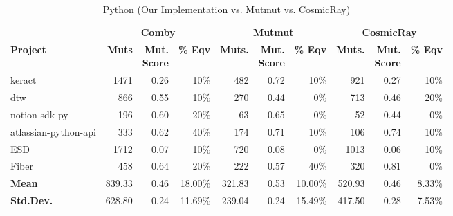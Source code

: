 \documentclass[sigconf,review, anonymous]{acmart}
\newcommand{\mc}[3]{\multicolumn{#1}{#2}{#3}}
\begin{document}
\begin{table*}[htbp]
\centering
{
\caption{Python (Our Implementation vs. Mutmut vs. CosmicRay)}
\label{tab:table_python2}
\begin{tabular}{l|rrr|rrr|rrr}
\toprule
                 & \mc{3}{c|}{\textbf{Comby}}   & \mc{3}{c|}{\textbf{Mutmut}} & \mc{3}{c}{\textbf{CosmicRay}} \\
\textbf{Project} & \textbf{Muts} &  \makecell{\textbf{Mut.} \\ \textbf{Score}} & \textbf{\% Eqv}
& \textbf{Muts.} &  \makecell{\textbf{Mut.} \\ \textbf{Score}} & \textbf{\% Eqv} 
& \textbf{Muts.} &  \makecell{\textbf{Mut.} \\ \textbf{Score}} & \textbf{\% Eqv} \\ \midrule
\midrule
keract & 1471 & 0.26 & 10\% & 482 & 0.72 & 10\% & 921 & 0.27 & 10\% \\
dtw & 866 & 0.55 & 10\% & 270 & 0.44 & 0\% & 713 & 0.46 & 20\% \\
notion-sdk-py & 196 & 0.60 & 20\% & 63 & 0.65 & 0\% & 52 & 0.44 & 0\% \\
atlassian-python-api & 333 & 0.62 & 40\% & 174 & 0.71 & 10\% & 106 & 0.74 & 10\% \\
ESD & 1712 & 0.07 & 10\% & 720 & 0.08 & 0\% & 1013 & 0.06 & 10\% \\
Fiber & 458 & 0.64 & 20\% & 222 & 0.57 & 40\% & 320 & 0.81 & 0\% \\\midrule
\textbf{Mean} &  839.33 & 0.46 & 18.00\% & 321.83 & 0.53 & 10.00\% & 520.93 & 0.46 & 8.33\% \\
\textbf{Std.Dev.} &  628.80 & 0.24 & 11.69\% & 239.04 & 0.24 & 15.49\% & 417.50 & 0.28 & 7.53\% \\\bottomrule        
\end{tabular}
}
\end{table*}


\end{document}
